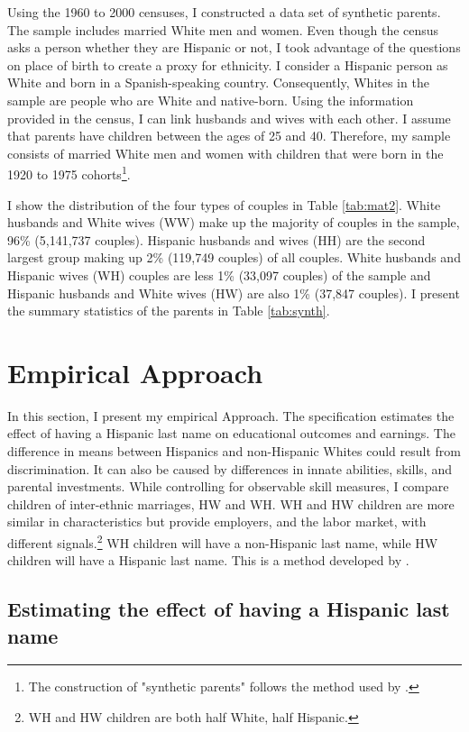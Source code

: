 Using the 1960 to 2000 censuses, I constructed a data set of synthetic parents. The sample includes married White men and women. Even though the census asks a person whether they are Hispanic or not, I took advantage of the questions on place of birth to create a proxy for ethnicity. I consider a Hispanic person as White and born in a Spanish-speaking country. Consequently, Whites in the sample are people who are White and native-born. Using the information provided in the census, I can link husbands and wives with each other. I assume that parents have children between the ages of 25 and 40. Therefore, my sample consists of married White men and women with children that were born in the 1920 to 1975 cohorts\footnote{The construction of "synthetic parents" follows the method used by \textcite{rubinstein2014pride}.}.

I show the distribution of the four types of couples in Table \ref{tab:mat2}. White husbands and White wives (WW) make up the majority of couples in the sample, 96\% (5,141,737 couples). Hispanic husbands and wives (HH) are the second largest group making up 2\% (119,749 couples) of all couples. White husbands and Hispanic wives (WH) couples are less 1\% (33,097 couples) of the sample and Hispanic husbands and White wives (HW) are also 1\% (37,847 couples). I present the summary statistics of the parents in Table \ref{tab:synth}.

\section{Empirical Approach}\label{sec:emp_model}

In this section, I present my empirical Approach. The specification estimates the effect of having a Hispanic last name on educational outcomes and earnings. The difference in means between Hispanics and non-Hispanic Whites could result from discrimination. It can also be caused by differences in innate abilities, skills, and parental investments. While controlling for observable skill measures, I compare children of inter-ethnic marriages, HW and WH. WH and HW children are more similar in characteristics but provide employers, and the labor market, with different signals.\footnote{WH and HW children are both half White, half Hispanic.} WH children will have a non-Hispanic last name, while HW children will have a Hispanic last name. This is a method developed by \textcite{rubinstein2014pride}.

\subsection{Estimating the effect of having a Hispanic last name}

